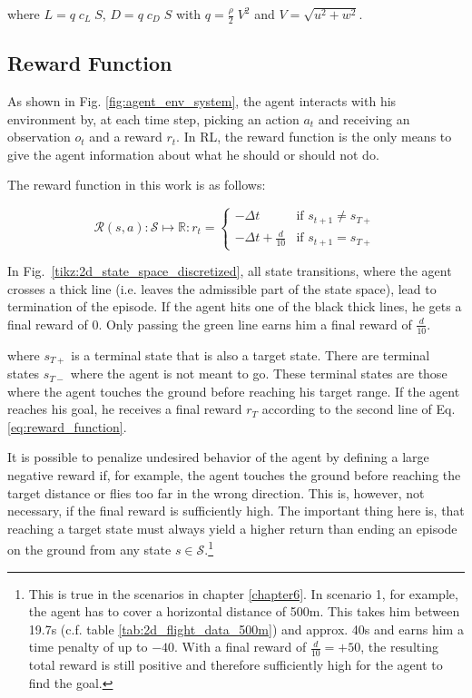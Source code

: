 where $L = q \; c_L \; S$, $D = q \; c_D \; S$ with $q = \frac{\rho}{2}\; V^2$ and $V=\sqrt{u^2+w^2}$.

\subsection{Reward Function}
\label{sec:reward-function}

As shown in Fig. \ref{fig:agent_env_system}, the agent interacts with his environment by, at each time step, picking an action $a_t$ and receiving an observation $o_t$ and a reward $r_t$. In RL, the reward function is the only means to give the agent information about what he should or should not do.

The reward function in this work is as follows:

\begin{equation}
\mathcal{R}(s,a): \mathcal{S} \mapsto \mathbb{R}: r_t =
\begin{cases}
-\Delta t & \text{if } s_{t+1} \neq s_{T+}\\
-\Delta t + \frac{d}{10} & \text{if } s_{t+1} = s_{T+}
\end{cases}
\label{eq:reward_function}
\end{equation}

In Fig.~\ref{tikz:2d_state_space_discretized}, all state transitions, where the agent crosses a thick line (i.e. leaves the admissible part of the state space), lead to termination of the episode. If the agent hits one of the black thick lines, he gets a final reward of $0$. Only passing the green line earns him a final reward of $\frac{d}{10}$.

where $s_{T+}$ is a terminal state that is also a target state. There are terminal states $s_{T-}$ where the agent is not meant to go. These terminal states are those where the agent touches the ground before reaching his target range. If the agent reaches his goal, he receives a final reward $r_T$ according to the second line of Eq. \ref{eq:reward_function}. 

It is possible to penalize undesired behavior of the agent by defining a large negative reward if, for example, the agent touches the ground before reaching the target distance or flies too far in the wrong direction. This is, however, not necessary, if the final reward is sufficiently high. The important thing here is, that reaching a target state must always yield a higher return than ending an episode on the ground from any state $s \in \mathcal{S}$.\footnote{This is true in the scenarios in chapter \ref{chapter6}. In scenario 1, for example, the agent has to cover a horizontal distance of 500m. This takes him between 19.7s (c.f. table \ref{tab:2d_flight_data_500m}) and approx. 40s and earns him a time penalty of up to $-40$. With a final reward of $\frac{d}{10}=+50$, the resulting total reward is still positive and therefore sufficiently high for the agent to find the goal.}

